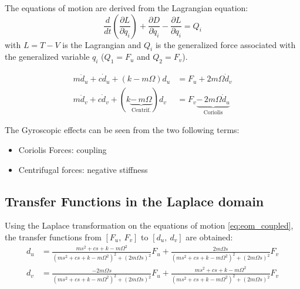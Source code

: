 \documentclass{ISMA_USD2020}
\begin{document}
The equations of motion are derived from the Lagrangian equation:
\begin{equation}
\label{eq:lagrangian_equations}
  \frac{d}{dt} \left( \frac{\partial L}{\partial \dot{q}_i} \right) + \frac{\partial D}{\partial \dot{q}_i} - \frac{\partial L}{\partial q_i} = Q_i
\end{equation}
with \(L = T - V\) is the Lagrangian and \(Q_i\) is the generalized force associated with the generalized variable \(q_i\) (\(Q_1 = F_u\) and \(Q_2 = F_v\)).

\begin{subequations}
\label{eq:eom_coupled}
  \begin{align}
    m \ddot{d}_u + c \dot{d}_u + ( k - m \Omega ) d_u &= F_u + 2 m \Omega \dot{d}_v \\
    m \ddot{d}_v + c \dot{d}_v + ( k \underbrace{-\,m \Omega}_{\text{Centrif.}} ) d_v &= F_v \underbrace{-\,2 m \Omega \dot{d}_u}_{\text{Coriolis}}
  \end{align}
\end{subequations}

The Gyroscopic effects can be seen from the two following terms:
\begin{itemize}
\item Coriolis Forces: coupling
\item Centrifugal forces: negative stiffness
\end{itemize}

\subsection{Transfer Functions in the Laplace domain}
\label{sec:orge7e184a}

Using the Laplace transformation on the equations of motion \eqref{eq:eom_coupled}, the transfer functions from \([F_u,\ F_v]\) to \([d_u,\ d_v]\) are obtained:
\begin{subequations}
\label{eq:oem_laplace_domain}
  \begin{align}
    d_u &= \frac{ms^2 + cs + k - m \Omega^2}{\left( m s^2 + cs + k - m \Omega^2 \right)^2 + \left( 2 m \Omega s \right)^2} F_u +  \frac{2 m \Omega s}{\left( m s^2 + cs + k - m \Omega^2 \right)^2 + \left( 2 m \Omega s \right)^2} F_v \\
    d_v &= \frac{-2 m \Omega s}{\left( m s^2 + cs + k - m \Omega^2 \right)^2 + \left( 2 m \Omega s \right)^2} F_u +  \frac{ms^2 + cs + k - m \Omega^2}{\left( m s^2 + cs + k - m \Omega^2 \right)^2 + \left( 2 m \Omega s \right)^2} F_v
  \end{align}
\end{subequations}
\end{document}
